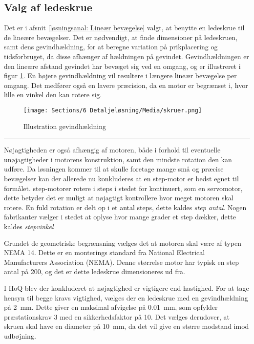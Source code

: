 \subsection{Valg af ledeskrue} \label{Valg af led screw og motor}
Det er i afsnit \ref{løsningsanal: Lineær bevægelse} valgt, at benytte en ledeskrue til de lineære bevægelser. Det er nødvendigt, at finde dimensioner på ledeskruen, samt dens gevindhældning, for at beregne variation på prikplacering og tidsforbruget, da disse afhænger af hældningen på gevindet. 
Gevindhældningen er den lineære afstand gevindet har bevæget sig ved en omgang, og er illustreret i figur \ref{fig: skrue forklaringer}. En højere gevindhældning vil resultere i længere lineær bevægelse per omgang. Det medfører også en lavere præcision, da en motor er begrænset i, hvor lille en vinkel den kan rotere sig.


\begin{figure}[H]
    \centering
    \texttt{[image: Sections/6 Detaljeløsning/Media/skruer.png]}
    \caption{Illustration gevindhældning}
    \label{fig: skrue forklaringer}
\end{figure} \plainbreak{-0.5}

Nøjagtigheden er også afhængig af motoren, både i forhold til eventuelle unøjagtigheder i motorens konstruktion, samt den mindste rotation den kan udføre. Da løsningen kommer til at skulle foretage mange små og præcise bevægelser kan der allerede nu konkluderes at en step-motor er bedst egnet til formålet. step-motorer rotere i steps i stedet for kontinuert, som en servomotor, dette betyder det er muligt at nøjagtigt kontrollere hvor meget motoren skal rotere. En fuld rotation er delt op i et antal steps, dette kaldes \textit{step antal}. Nogen fabrikanter vælger i stedet at oplyse hvor mange grader et step dækker, dette kaldes \textit{stepvinkel}

Grundet de geometriske begrænsning vælges det at motoren skal være af typen NEMA 14. Dette er en monterings standard fra National Electrical Manufacturers Association (NEMA). Denne størrelse motor har typisk en step antal på 200, og det er dette ledeskrue dimensioneres ud fra.

I HoQ blev der konkluderet at nøjagtighed er vigtigere end hastighed.  For at tage hensyn til begge kravs vigtighed, vælges der en ledeskrue med en gevindhældning på \SI{2}{mm}. Dette giver en maksimal afvigelse på \SI{0,01}{mm}, som opfylder præstationskrav 3 med en sikkerhedsfaktor på 10. Det vælges derudover, at skruen skal have en diameter på \SI{10}{mm}, da det vil give en større modstand imod udbøjning. \parencite{Igus2025DrylinSteel}





